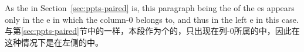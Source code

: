 \begin{paracol}{2}
As the \postenv{} in Section~\ref{sec:ppts-paired} is, this paragraph
being the \postenv{} of the \npaired{} \parapag{}es appears only in the
\parapag{}e in which the column-0 belongs to, and thus in the left
\parapag{}e in this case.
\switchcolumn
与第\ref{sec:ppts-paired}节中的\postenv{}一样，本段作为\npaired{}个\parapag{}的\postenv{}，只出现在列-0所属的\parapag{}中，因此在这种情况下是在左侧的\parapag{}中。
\end{paracol}

